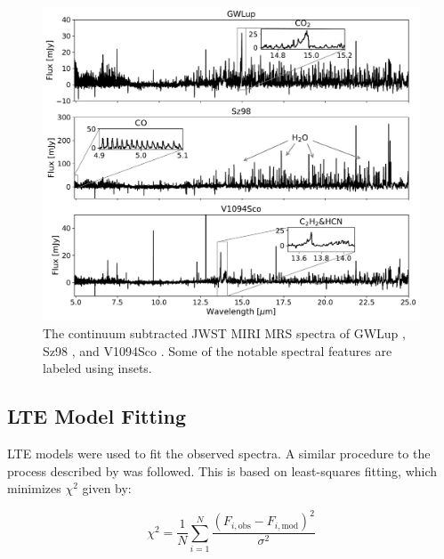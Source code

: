 \documentclass[oneside, single, authoryear, semicolon, 12pt]{lion-msc}
\newcommand{\4}{$_4$}
\newcommand{\3}{$_3$}
\newcommand{\2}{$_2$}
\begin{document}
\begin{figure}[H]
    \centering
    \includegraphics[width=\linewidth]{Figures/Measurements.pdf}
    \caption{The continuum subtracted JWST MIRI MRS spectra of GWLup \citep{Gasman_2023}, Sz98 \citep{Grant_2023}, and V1094Sco \citep{taboneinprepp}. Some of the notable spectral features are labeled using insets.}
    \label{fig: Measurements}
\end{figure}

\subsection{LTE Model Fitting}
LTE models were used to fit the observed spectra. A similar procedure to the process described by \cite{Grant_2023} was followed. This is based on least-squares fitting, which minimizes $\chi^2$ given by:

\begin{equation}
    \chi^2=\frac{1}{N}\sum_{i=1}^N\frac{(F_{i,\mathrm{obs}}-F_{i, \mathrm{mod}})^2}{\sigma^2}
    \label{eq: chi-square}
\end{equation}
\end{document}
